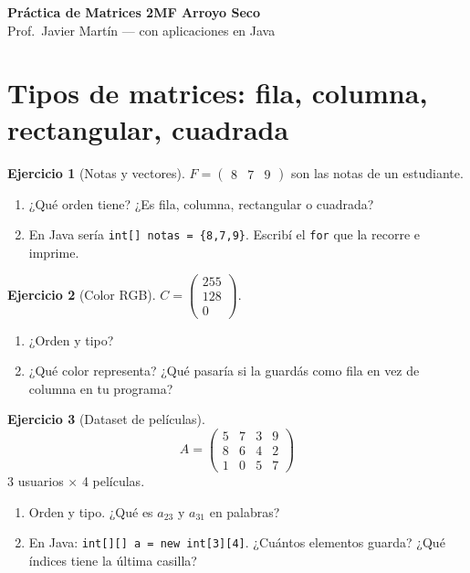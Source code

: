 \documentclass[a4paper,12pt]{article}
\theoremstyle{definition}
\newtheorem{ejercicio}{Ejercicio}[section]
\begin{document}
\begin{tcolorbox}[enhanced, colback=NavyBlue, colframe=NavyBlue!80!black,
  arc=4mm, boxrule=1pt, left=4mm, right=4mm, top=3mm, bottom=3mm, halign=center]
{\Large\bfseries\color{white} Práctica de Matrices 2MF Arroyo Seco}\\[1mm]
{\color{white!90!} Prof.\ Javier Martín --- con aplicaciones en Java}
\end{tcolorbox}


\section{Tipos de matrices: fila, columna, rectangular, cuadrada}
\begin{ejercicio}[Notas y vectores]
$F = \begin{pmatrix} 8 & 7 & 9 \end{pmatrix}$ son las notas de un estudiante.
\begin{enumerate}[label=\alph*)]
\item ¿Qué orden tiene? ¿Es fila, columna, rectangular o cuadrada?
\item En Java sería \texttt{int[] notas = \{8,7,9\}}. Escribí el \texttt{for} que la recorre e imprime.
\end{enumerate}
\end{ejercicio}

\begin{ejercicio}[Color RGB]
$C = \begin{pmatrix} 255 \\ 128 \\ 0 \end{pmatrix}$.
\begin{enumerate}[label=\alph*)]
\item ¿Orden y tipo?
\item ¿Qué color representa? ¿Qué pasaría si la guardás como fila en vez de columna en tu programa?
\end{enumerate}
\end{ejercicio}

\begin{ejercicio}[Dataset de películas]
\[
A = \begin{pmatrix}
5 & 7 & 3 & 9 \\
8 & 6 & 4 & 2 \\
1 & 0 & 5 & 7
\end{pmatrix}
\]
3 usuarios $\times$ 4 películas.
\begin{enumerate}[label=\alph*)]
\item Orden y tipo. ¿Qué es $a_{23}$ y $a_{31}$ en palabras?
\item En Java: \texttt{int[][] a = new int[3][4]}. ¿Cuántos elementos guarda? ¿Qué índices tiene la última casilla?
\end{enumerate}
\end{ejercicio}
\end{document}
